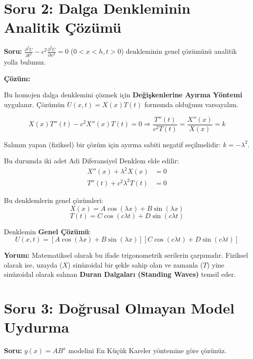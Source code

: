\documentclass[12pt, a4paper]{article}
\begin{document}
\hrulefill

\section*{Soru 2: Dalga Denkleminin Analitik Çözümü}

\textbf{Soru:} $\frac{\partial^2 U}{\partial t^2} - c^2 \frac{\partial^2 U}{\partial x^2} = 0$ ($0 < x < h, t > 0$) denkleminin genel çözümünü analitik yolla bulunuz.

\textbf{Çözüm:}

Bu homojen dalga denklemini çözmek için \textbf{Değişkenlerine Ayırma Yöntemi} uygulanır.
Çözümün $U(x,t) = X(x)T(t)$ formunda olduğunu varsayalım.

\begin{equation}
X(x)T''(t) - c^2 X''(x)T(t) = 0 \Rightarrow \frac{T''(t)}{c^2 T(t)} = \frac{X''(x)}{X(x)} = k
\end{equation}

Salınım yapan (fiziksel) bir çözüm için ayırma sabiti negatif seçilmelidir: $k = -\lambda^2$.

Bu durumda iki adet Adi Diferansiyel Denklem elde edilir:
\begin{align}
X''(x) + \lambda^2 X(x) &= 0 \\
T''(t) + c^2 \lambda^2 T(t) &= 0
\end{align}

Bu denklemlerin genel çözümleri:
\[ X(x) = A \cos(\lambda x) + B \sin(\lambda x) \]
\[ T(t) = C \cos(c\lambda t) + D \sin(c\lambda t) \]

Denklemin \textbf{Genel Çözümü}:
\begin{equation}
U(x,t) = \left[ A \cos(\lambda x) + B \sin(\lambda x) \right] \left[ C \cos(c\lambda t) + D \sin(c\lambda t) \right]
\end{equation}

\textbf{Yorum:} Matematiksel olarak bu ifade trigonometrik serilerin çarpımıdır. Fiziksel olarak ise, uzayda ($X$) sinüzoidal bir şekle sahip olan ve zamanla ($T$) yine sinüzoidal olarak salınan \textbf{Duran Dalgaları (Standing Waves)} temsil eder.

\hrulefill

\section*{Soru 3: Doğrusal Olmayan Model Uydurma}

\textbf{Soru:} $y(x) = AB^x$ modelini En Küçük Kareler yöntemine göre çözünüz.
\end{document}
